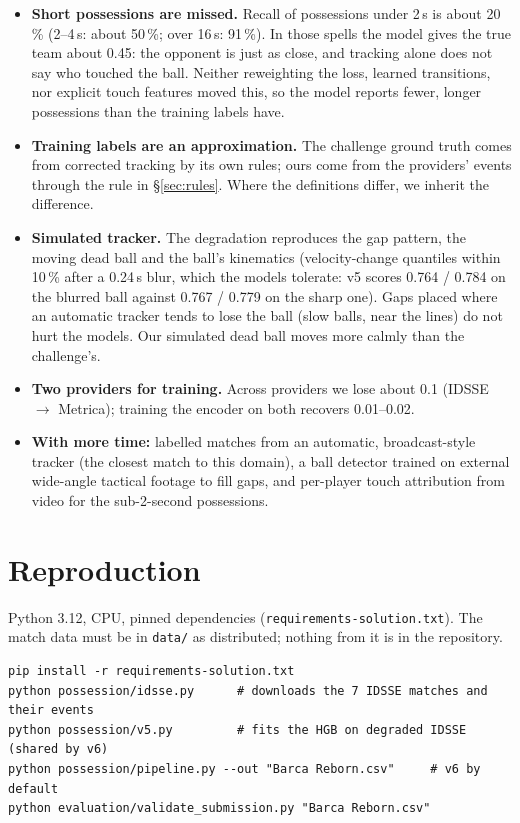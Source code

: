 \documentclass[10pt,a4paper]{article}
\newcommand{\code}[1]{\texttt{#1}}
\begin{document}
\begin{itemize}
\item \textbf{Short possessions are missed.} Recall of possessions under 2\,s is about 20\,\%
  (2--4\,s: about 50\,\%; over 16\,s: 91\,\%). In those spells the model gives the true team about
  0.45: the opponent is just as close, and tracking alone does not say who touched the ball.
  Neither reweighting the loss, learned transitions, nor explicit touch features moved this, so
  the model reports fewer, longer possessions than the training labels have.
\item \textbf{Training labels are an approximation.} The challenge ground truth comes from
  corrected tracking by its own rules; ours come from the providers' events through the rule in
  \S\ref{sec:rules}. Where the definitions differ, we inherit the difference.
\item \textbf{Simulated tracker.} The degradation reproduces the gap pattern, the moving dead ball
  and the ball's kinematics (velocity-change quantiles within 10\,\% after a 0.24\,s blur, which
  the models tolerate: v5 scores 0.764 / 0.784 on the blurred ball against 0.767 / 0.779 on the
  sharp one). Gaps placed where an automatic tracker
  tends to lose the ball (slow balls, near the lines) do not hurt the models. Our simulated dead
  ball moves more calmly than the challenge's.
\item \textbf{Two providers for training.} Across providers we lose about 0.1 (IDSSE $\to$
  Metrica); training the encoder on both recovers 0.01--0.02.
\item \textbf{With more time:} labelled matches from an automatic, broadcast-style tracker (the
  closest match to this domain), a ball detector trained on external wide-angle tactical footage to
  fill gaps, and per-player touch attribution from video for the sub-2-second possessions.
\end{itemize}

\section{Reproduction}

Python 3.12, CPU, pinned dependencies (\code{requirements-solution.txt}). The match data must be in
\code{data/} as distributed; nothing from it is in the repository.

\begin{verbatim}
pip install -r requirements-solution.txt
python possession/idsse.py      # downloads the 7 IDSSE matches and their events
python possession/v5.py         # fits the HGB on degraded IDSSE (shared by v6)
python possession/pipeline.py --out "Barca Reborn.csv"     # v6 by default
python evaluation/validate_submission.py "Barca Reborn.csv"
\end{verbatim}
\end{document}
